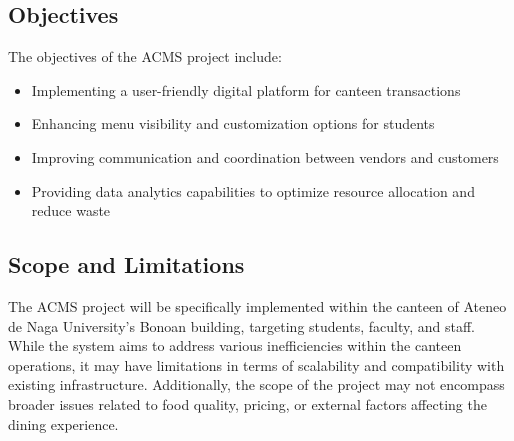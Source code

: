 \subsection{Objectives}
The objectives of the ACMS project include:
\begin{itemize}
\item Implementing a user-friendly digital platform for canteen transactions
\item  Enhancing menu visibility and customization options for students
\item  Improving communication and coordination between vendors and customers
\item  Providing data analytics capabilities to optimize resource allocation and reduce waste
\end{itemize}

\subsection{Scope and Limitations}
The ACMS project will be specifically implemented within the canteen of Ateneo de Naga University's Bonoan building, targeting students, faculty, and staff. While the system aims to address various inefficiencies within the canteen operations, it may have limitations in terms of scalability and compatibility with existing infrastructure. Additionally, the scope of the project may not encompass broader issues related to food quality, pricing, or external factors affecting the dining experience.
